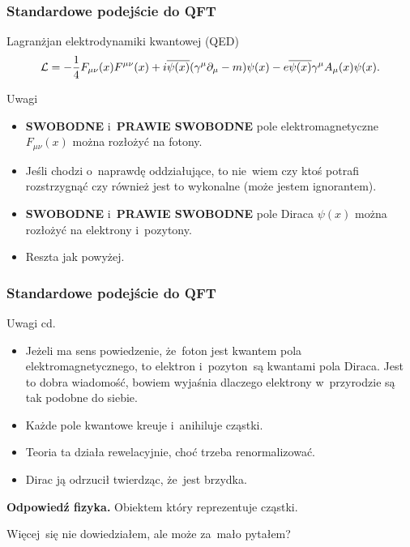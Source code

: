 \documentclass[10pt,t]{beamer}
\begin{document}
\begin{frame}
  \frametitle{Standardowe podejście do QFT}


  Lagranżjan elektrodynamiki kwantowej (QED)
  \begin{equation}
    \label{eq:O-roznych-01}
    \mathcal{L} =
    -\frac{ 1 }{ 4 } F_{ \mu \nu }( x ) F^{ \mu \nu }( x )
    + i \overline{\psi( x )} ( \gamma^{ \mu } \partial_{ \mu } - m ) \psi( x )
    - e \overline{\psi( x )} \gamma^{ \mu } A_{ \mu }( x ) \psi( x ).
  \end{equation}

  Uwagi
  \begin{itemize}

  \item \textbf{SWOBODNE} i~\textbf{PRAWIE SWOBODNE} pole
    elektromagnetyczne $F_{ \mu \nu }( x )$ można rozłożyć na fotony.

  \item Jeśli chodzi o~naprawdę oddziałujące, to nie~wiem czy ktoś potrafi
    rozstrzygnąć czy również jest to wykonalne (może jestem ignorantem).

  \item \textbf{SWOBODNE} i~\textbf{PRAWIE SWOBODNE} pole Diraca $\psi( x )$
    można rozłożyć na elektrony i~pozytony.

  \item Reszta jak powyżej.

  \end{itemize}

\end{frame}





\begin{frame}
  \frametitle{Standardowe podejście do QFT}


  Uwagi cd.
  \begin{itemize}

  \item Jeżeli ma sens powiedzenie, że~foton jest kwantem pola
    elektromagnetycznego, to elektron i~pozyton~są kwantami pola
    Diraca. Jest to dobra wiadomość, bowiem wyjaśnia dlaczego
    elektrony w~przyrodzie są tak podobne do siebie.

  \item Każde pole kwantowe kreuje i~anihiluje cząstki.

  \item Teoria ta działa rewelacyjnie, choć trzeba renormalizować.

  \item Dirac ją odrzucił twierdząc, że~jest brzydka.

  \end{itemize}



  \textbf{Odpowiedź fizyka.} Obiektem który reprezentuje cząstki.

  Więcej~się nie dowiedziałem, ale może za~mało pytałem?

\end{frame}
\end{document}

